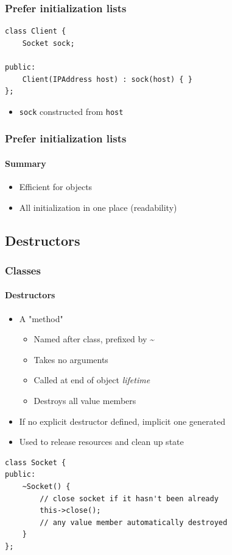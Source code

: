 \documentclass[table]{beamer}
\newcounter{rulecount}
\newcommand{\declarerule}{\textbf{\color{themeblue}{Rule \therulecount:}} }
\newcommand{\declarelesson}{\textbf{\color{themegreen}{Lesson:}} }
\begin{document}
\begin{frame}[fragile]
    \frametitle{\declarerule Prefer initialization lists}
    \begin{lstlisting}[title=Initialization list]
class Client {
    Socket sock;

public:
    Client(IPAddress host) : sock(host) { }
};
    \end{lstlisting}
    \begin{itemize}
        \item \texttt{sock} constructed from \texttt{host}
    \end{itemize}
\end{frame}

\begin{frame}
    \frametitle{\declarerule Prefer initialization lists}
    \framesubtitle{Summary}
    \begin{itemize}
        \item Efficient for objects
        \item All initialization in one place (\alert{readability})
    \end{itemize}
\end{frame}


\subsection{Destructors}
\frame{\subsectionpage}

\begin{frame}[fragile]
    \frametitle{\declarelesson Classes}
    \framesubtitle{Destructors}
    \begin{itemize}
        \item A "method" 
            \begin{itemize}
                \item Named after class, prefixed by \textasciitilde
                \item Takes no arguments
                \item Called at end of object \emph{lifetime}
                \item Destroys all value members
            \end{itemize}
        \item If no explicit destructor defined, implicit one generated
        \item Used to release resources and clean up state
    \end{itemize}
    \begin{lstlisting}[title=Cleanup in destructor]
class Socket {
public:
    ~Socket() {
        // close socket if it hasn't been already
        this->close();
        // any value member automatically destroyed 
    }
};
    \end{lstlisting}
\end{frame}
\end{document}
